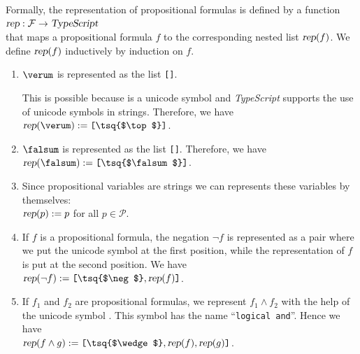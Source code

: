 Formally, the representation of propositional formulas is defined by a function 
\\[0.2cm]
\hspace*{1.3cm}
$\textsl{rep}: \mathcal{F} \rightarrow \textsl{TypeScript}$
\\[0.2cm]
that maps a propositional formula $f$ to the corresponding nested list 
$\textsl{rep}(f)$.  We define $\textsl{rep}(f)$ inductively by induction on $f$.
\begin{enumerate}
\item $\verum$ is represented as the list \texttt{[\tsq{$\top$}]}.
  
      This is possible because \texttt{\tsq{$\top$}} is a unicode symbol and \textsl{TypeScript} supports the
      use of unicode symbols in strings.  Therefore, we have  
      \\[0.2cm]
      \hspace*{1.3cm}
      $\textsl{rep}(\verum) := \texttt{[\tsq{$\top$}]}$.
\item $\falsum$  is represented as the list \texttt{[\tsq{$\falsum$}]}.      
      Therefore, we have
      \\[0.2cm]
      \hspace*{1.3cm}
      $\textsl{rep}(\falsum) := \texttt{[\tsq{$\falsum$}]}$.
\item Since propositional variables are strings we can represents these variables by themselves:
      \\[0.2cm]
      \hspace*{1.3cm}
      $\textsl{rep}(p) := p$ \quad for all $p \in \mathcal{P}$.
\item If $f$ is a propositional formula, the  negation $\neg f$ is represented as a pair where
      we put the unicode symbol \texttt{\tsq{$\neg$}} at the first position, while the representation of $f$ is put
      at the second position.  We have
      \\[0.2cm]
      \hspace*{1.3cm} 
      $\textsl{rep}(\neg f) := \texttt{[}\texttt{\tsq{$\neg$}}, \textsl{rep}(f)\texttt{]}$.
\item If $f_1$ and $f_2$ are propositional formulas, we represent $f_1 \wedge f_2$ with the help of the
      unicode symbol \texttt{\tsq{$\wedge$}}.  This symbol has the name ``\texttt{logical and}''.  Hence we have
      \\[0.2cm]
      \hspace*{1.3cm} 
      $\textsl{rep}(f \wedge g) := \texttt{[\tsq{$\wedge$}}, \textsl{rep}(f), \textsl{rep}(g)\texttt{]}$.

\end{enumerate}

